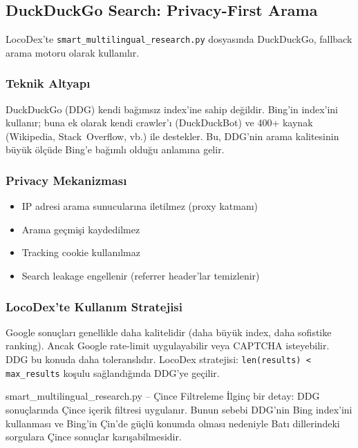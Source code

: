 \subsection{DuckDuckGo Search: Privacy-First Arama}
\label{subsec:duckduckgo}

LocoDex'te \texttt{smart\_multilingual\_research.py} dosyas{\i}nda DuckDuckGo, fallback arama motoru olarak kullan{\i}l{\i}r.

\subsubsection{Teknik Altyap{\i}}

DuckDuckGo (DDG) kendi ba\u{g}{\i}ms{\i}z index'ine sahip de\u{g}ildir. Bing'in index'ini kullan{\i}r; buna ek olarak kendi crawler'{\i} (DuckDuckBot) ve 400+ kaynak (Wikipedia, Stack~Overflow, vb.) ile destekler. Bu, DDG'nin arama kalitesinin b\"{u}y\"{u}k \"{o}l\c{c}\"{u}de Bing'e ba\u{g}{\i}ml{\i} oldu\u{g}u anlam{\i}na gelir.

\subsubsection{Privacy Mekanizmas{\i}}

\begin{itemize}
  \item IP adresi arama sunucular{\i}na iletilmez (proxy katman{\i})
  \item Arama ge\c{c}mi\c{s}i kaydedilmez
  \item Tracking cookie kullan{\i}lmaz
  \item Search leakage engellenir (referrer header'lar temizlenir)
\end{itemize}

\subsubsection{LocoDex'te Kullan{\i}m Stratejisi}

Google sonu\c{c}lar{\i} genellikle daha kalitelidir (daha b\"{u}y\"{u}k index, daha sofistike ranking). Ancak Google rate-limit uygulayabilir veya CAPTCHA isteyebilir. DDG bu konuda daha toleransl{\i}d{\i}r. LocoDex stratejisi: \texttt{len(results) < max\_results} ko\c{s}ulu sa\u{g}land{\i}\u{g}{\i}nda DDG'ye ge\c{c}ilir.

\begin{kodref}{smart\_multilingual\_research.py -- \c{C}ince Filtreleme}
\.{I}lgin\c{c} bir detay: DDG sonu\c{c}lar{\i}nda \c{C}ince i\c{c}erik filtresi uygulan{\i}r. Bunun sebebi DDG'nin Bing index'ini kullanmas{\i} ve Bing'in \c{C}in'de g\"{u}\c{c}l\"{u} konumda olmas{\i} nedeniyle Bat{\i} dillerindeki sorgulara \c{C}ince sonu\c{c}lar kar{\i}\c{s}abilmesidir.
\end{kodref}


